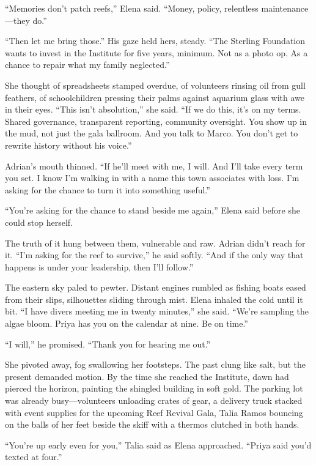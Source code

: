 “Memories don’t patch reefs,” Elena said. “Money, policy, relentless maintenance—they do.”

“Then let me bring those.” His gaze held hers, steady. “The Sterling Foundation wants to invest in the Institute for five years, minimum. Not as a photo op. As a chance to repair what my family neglected.”

She thought of spreadsheets stamped overdue, of volunteers rinsing oil from gull feathers, of schoolchildren pressing their palms against aquarium glass with awe in their eyes. “This isn’t absolution,” she said. “If we do this, it’s on my terms. Shared governance, transparent reporting, community oversight. You show up in the mud, not just the gala ballroom. And you talk to Marco. You don’t get to rewrite history without his voice.”

Adrian’s mouth thinned. “If he’ll meet with me, I will. And I’ll take every term you set. I know I’m walking in with a name this town associates with loss. I’m asking for the chance to turn it into something useful.”

“You’re asking for the chance to stand beside me again,” Elena said before she could stop herself.

The truth of it hung between them, vulnerable and raw. Adrian didn’t reach for it. “I’m asking for the reef to survive,” he said softly. “And if the only way that happens is under your leadership, then I’ll follow.”

The eastern sky paled to pewter. Distant engines rumbled as fishing boats eased from their slips, silhouettes sliding through mist. Elena inhaled the cold until it bit. “I have divers meeting me in twenty minutes,” she said. “We’re sampling the algae bloom. Priya has you on the calendar at nine. Be on time.”

“I will,” he promised. “Thank you for hearing me out.”

She pivoted away, fog swallowing her footsteps. The past clung like salt, but the present demanded motion. By the time she reached the Institute, dawn had pierced the horizon, painting the shingled building in soft gold. The parking lot was already busy—volunteers unloading crates of gear, a delivery truck stacked with event supplies for the upcoming Reef Revival Gala, Talia Ramos bouncing on the balls of her feet beside the skiff with a thermos clutched in both hands.

“You’re up early even for you,” Talia said as Elena approached. “Priya said you’d texted at four.”

